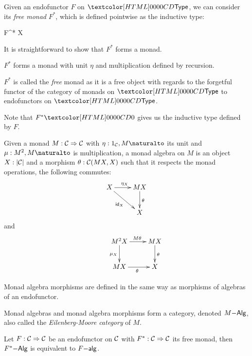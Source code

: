 Given an endofunctor $F$ on $\Type$, we can consider its \emph{free
  monad} $F^*$, which is defined pointwise as the inductive type:

\begin{datatype}{F^* X}{\Type}
   \\
\end{datatype}

It is straightforward to show that $F^*$ forms a monad.

\begin{proposition}
  $F^*$ forms a monad with unit $\eta$ and multiplication defined by
  recursion.
\end{proposition}

$F^*$ is called the \emph{free} monad as it is a free object with
regards to the forgetful functor of the category of monads on $\Type$
to endofunctors on $\Type$.

Note that $F^* \emptyty$ gives us the inductive type defined by $F$.

\begin{definition}
  Given a monad $M : \mathcal{C} \Rightarrow \mathcal{C}$ with $\eta : \Nat{1_{\Cc},M}$
  its unit and $\mu : \Nat{M^2,M}$ is multiplication, a monad algebra
  on $M$ is an object $X : | \mathcal{C} |$ and a morphism
  $\theta : \mathcal{C}(MX,X)$ such that it respects the monad operations, \ie
  the following commutes:
  $$
  \xymatrix{
    X \ar[r]^{\eta_X} \ar[dr]_{\id_X} &MX \ar[d]^{\theta} \\
    &X
  }
  $$
  and
  $$
  \xymatrix{
    &M^2 X \ar[r]^{M \theta} \ar[d]_{\mu_X} &MX \ar[d]^{\theta} \\
    &MX \ar[r]_{\theta} &X
  }
  $$

  Monad algebra morphisms are defined in the same way as morphisms of
  algebras of an endofunctor.
\end{definition}

\begin{proposition}
  Monad algebras and monad algebra morphisms form a category, denoted
  $M\mathsf{-Alg}$, also called the \emph{Eilenberg-Moore category} of
  $M$.
\end{proposition}

\begin{theorem}
  Let $F : \mathcal{C} \Rightarrow \mathcal{C}$ be an endofunctor on $\mathcal{C}$ with
  $F^* : \mathcal{C} \Rightarrow \mathcal{C}$ its free monad, then $F^*\mathsf{-Alg}$ is
  equivalent to $F\mathsf{-alg}$.
\end{theorem}

